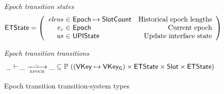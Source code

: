\documentclass[11pt,a4paper]{article}
\newcommand{\powerset}[1]{\mathbb{P}~#1}
\newcommand{\var}[1]{\mathit{#1}}
\newcommand{\type}[1]{\mathsf{#1}}
\newcommand{\trans}[2]{\xlongrightarrow[\textsc{#1}]{#2}}
\newcommand{\partialf}{\mapsto}
\newcommand{\Slot}{\type{Slot}}
\newcommand{\SlotCount}{\type{SlotCount}}
\newcommand{\VKey}{\type{VKey}}
\newcommand{\VKeyGen}{\type{VKey_G}}
\begin{document}
\begin{figure}[ht]

  \emph{Epoch transition states}
  \begin{equation*}
    \ETState =
    \left(
      \begin{array}{r@{~\in~}lr}
        \var{elens} & \Epoch \partialf \SlotCount & \text{Historical epoch lengths} \\
        \var{e_c} & \Epoch & \text{Current epoch} \\
        \var{us} & \UPIState & \text{Update interface state}
      \end{array}
    \right)
  \end{equation*}

  \emph{Epoch transition transitions}
  \begin{equation*}
    \_ \vdash \var{\_} \trans{epoch}{\_} \var{\_} \subseteq
    \powerset ((\VKey \mapsto \VKeyGen) \times \ETState \times \Slot \times \ETState)
  \end{equation*}
  \caption{Epoch transition transition-system types}
  \label{fig:ts-types:epoch}
\end{figure}
\end{document}
